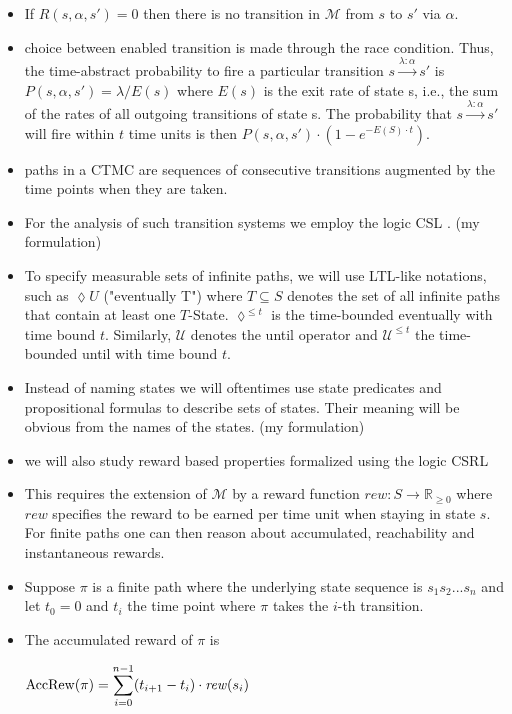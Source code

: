 \documentclass[a4paper, 10pt]{article}
\begin{document}
\begin{enumerate}
\begin{itemize}
	\item If $R(s, \alpha, s') = 0$ then there is no transition in $\mathcal{M}$ from $s$ to $s'$ via $\alpha$.
	\item choice between enabled transition is made through the race condition. Thus, the time-abstract probability to fire a particular transition $s \xrightarrow{\lambda : \alpha} s'$ is $P(s, \alpha, s') = \lambda / E(s)$ where $E(s)$ is the exit rate of state s, i.e., the sum of the rates of all outgoing transitions of state s. The probability that $s \xrightarrow{\lambda : \alpha} s'$ will fire within $t$ time units is then $P(s, \alpha, s') \cdot (1 - e^{- E(S) \cdot t})$.
	\item paths in a CTMC are sequences of consecutive transitions augmented by the time points when they are taken.
	\item For the analysis of such transition systems we employ the logic CSL \cite{assb96, bhhk00}. (my formulation)
	\item To specify measurable sets of infinite paths, we will use LTL-like notations, such as $\lozenge U$ ("eventually T") where $T \subseteq S$ denotes the set of all infinite paths that contain at least one $T$-State. $\lozenge^{\le t}$ is the time-bounded eventually with time bound $t$. Similarly, $\mathcal{U}$ denotes the until operator and $\mathcal{U}^{\le t}$ the time-bounded until with time bound $t$.
	\item Instead of naming states we will oftentimes use state predicates and propositional formulas to describe sets of states. Their meaning will be obvious from the names of the states. (my formulation)
	\item we will also study reward based properties formalized using the logic CSRL \cite{bhhk00}
	\item This requires the extension of $\mathcal{M}$ by a reward function $\mathit{rew} : S \rightarrow \mathbb{R}_{\ge 0}$ where $\mathit{rew}$ specifies the reward to be earned per time  unit when staying in state $s$. For finite paths one can then reason about accumulated, reachability and instantaneous rewards.
	\item Suppose $\pi$ is a finite path where the underlying state sequence is $s_1 s_2 ...s_n$ and let $t_0 = 0$ and $t_i$ the time point where $\pi$ takes the $i$-th transition.
	\item The accumulated reward of $\pi$ is
		\begin{center}
			$\mathrm{AccRew}(\pi) = \mathlarger{\sum}\limits_{i=0}^{n-1} (t_{i+1} - t_i) \cdot \mathit{rew}(s_i)$

\end{center}
\end{itemize}
\end{enumerate}
\end{document}
